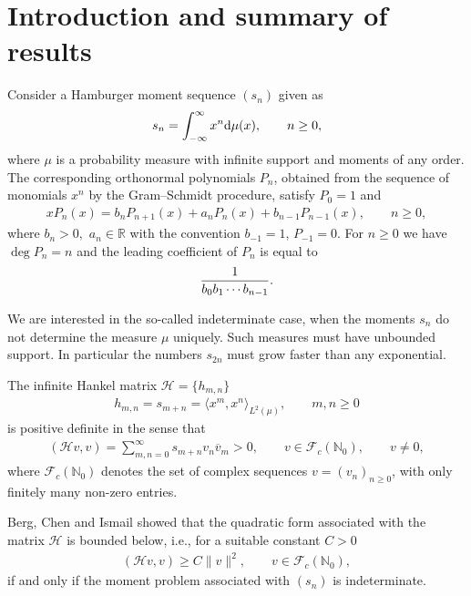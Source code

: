 \section{Introduction and summary of results}
Consider a Hamburger moment sequence $(s_n)$ given as
\begin{gather*}
s_n=\int_{-\infty}^\infty x^n{\rm d}\mu(x), \qquad n\ge 0,
\end{gather*}
 where $\mu$ is a probability measure with infinite support and moments of any order. The corresponding orthonormal polynomials $P_n$, obtained from the sequence of monomials $x^n$ by the Gram--Schmidt procedure, satisfy $P_0=1$ and
\begin{gather}\label{eq:rec}
xP_n(x)=b_nP_{n+1}(x)+a_nP_n(x)+b_{n-1}P_{n-1}(x),\qquad n\ge 0,
\end{gather}
where $b_n>0, $ $a_n\in\mathbb{R}$ with the convention $b_{-1}=1$, $P_{-1}=0$. For $n\ge 0$ we have $\deg P_n=n$ and the leading coefficient of $P_n$ is equal to
\begin{gather}\label{eq:lead}
{1\over b_0b_1\cdots b_{n-1}}.
\end{gather}

We are interested in the so-called indeterminate case, when the moments $s_n$ do not determine the measure $\mu$ uniquely. Such measures must have unbounded support. In particular the numbers $s_{2n}$ must grow faster than any exponential.

The infinite Hankel matrix $\mathcal H=\{h_{m,n}\}$
 \begin{gather*}
h_{m,n}=s_{m+n}=\big\langle x^m,x^n\big\rangle_{L^2(\mu)},\qquad m,n\ge 0
\end{gather*}
is positive definite in the sense that
\begin{gather}\label{eq:Hank}
(\mathcal Hv,v)=\sum_{m,n=0}^\infty s_{m+n}v_n\overline{v}_m>0,\qquad v\in \mathcal{F}_c(\mathbb{N}_0), \qquad v\neq 0,
\end{gather}
where $\mathcal{F}_c(\mathbb{N}_0)$ denotes the set of complex sequences $v=(v_n)_{n\ge 0}$, with only finitely many non-zero entries.

Berg, Chen and Ismail \cite{B:C:I} showed that the quadratic form associated with the matrix $\mathcal H$ is bounded below, i.e., for a suitable constant $C>0$
\begin{gather*}
(\mathcal{H}v,v)\ge C\|v\|^2,\qquad v\in \mathcal{F}_c(\mathbb{N}_0),
\end{gather*}
if and only if the moment problem associated with $(s_n)$ is indeterminate.

